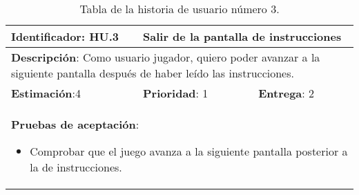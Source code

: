 \begin{table}[h]
  \begin{center}
    \begin{tabular}{|p{4cm}|p{4cm}|p{4cm}|}

    \hline
    \textbf{Identificador}: HU.3
    & \multicolumn{2}{p{8cm}|}{Salir de la pantalla de instrucciones}\\

    \hline
    \multicolumn{3}{|p{12cm}|}{\textbf{Descripción}: Como usuario jugador, quiero poder avanzar a la siguiente pantalla después de haber leído las instrucciones.}\\

    \hline
    \textbf{Estimación}:4
    & \textbf{Prioridad}: 1
    & \textbf{Entrega}: 2\\

    \hline
    \multicolumn{3}{|p{12cm}|}{\textbf{Pruebas de aceptación}:
      \begin{itemize}
        \item Comprobar que el juego avanza a la siguiente pantalla posterior a la de instrucciones.
      \end{itemize}
    }\\

    \hline

    \end{tabular}

    \caption{Tabla de la historia de usuario número 3.}
    \label{tabla-hu3}

  \end{center}
\end{table}

